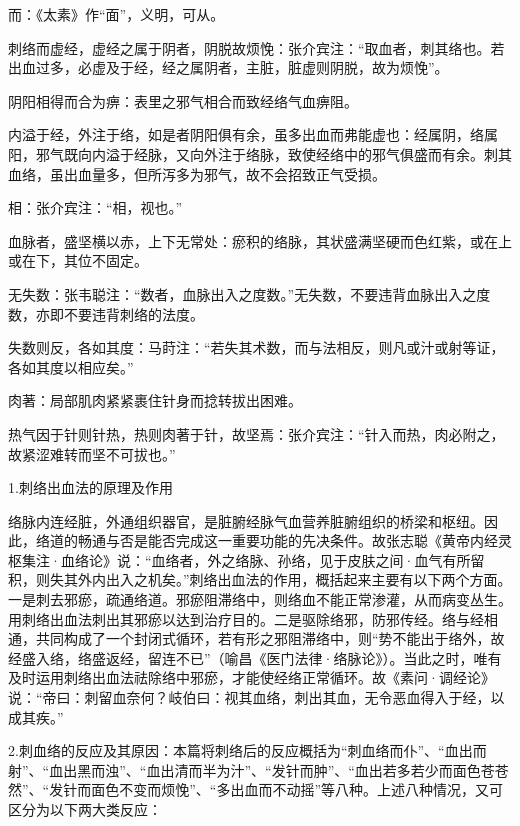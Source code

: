 \documentclass[12pt]{ctexbook}%
\begin{document}
\begin{jiaozhu}
  \item 而：《太素》作“面”，义明，可从。
  \item 刺络而虚经，虚经之属于阴者，阴脱故烦悗：张介宾注：“取血者，刺其络也。若出血过多，必虚及于经，经之属阴者，主脏，脏虚则阴脱，故为烦悗”。
  \item 阴阳相得而合为痹：表里之邪气相合而致经络气血痹阻。
  \item 内溢于经，外注于络，如是者阴阳俱有余，虽多出血而弗能虚也：经属阴，络属阳，邪气既向内溢于经脉，又向外注于络脉，致使经络中的邪气俱盛而有余。刺其血络，虽出血量多，但所泻多为邪气，故不会招致正气受损。
  \item 相：张介宾注：“相，视也。”
  \item 血脉者，盛坚横以赤，上下无常处：瘀积的络脉，其状盛满坚硬而色红紫，或在上或在下，其位不固定。
  \item 无失数：张韦聪注：“数者，血脉出入之度数。”无失数，不要违背血脉出入之度数，亦即不要违背刺络的法度。
  \item 失数则反，各如其度：马莳注：“若失其术数，而与法相反，则凡或汁或射等证，各如其度以相应矣。”
  \item 肉著：局部肌肉紧紧裹住针身而捻转拔出困难。
  \item 热气因于针则针热，热则肉著于针，故坚焉：张介宾注：“针入而热，肉必附之，故紧涩难转而坚不可拔也。”
\end{jiaozhu}


1.刺络出血法的原理及作用

络脉内连经脏，外通组织器官，是脏腑经脉气血营养脏腑组织的桥梁和枢纽。因此，络道的畅通与否是能否完成这一重要功能的先决条件。故张志聪《黄帝内经灵枢集注·血络论》说：“血络者，外之络脉、孙络，见于皮肤之间·血气有所留积，则失其外内出入之机矣。”刺络出血法的作用，概括起来主要有以下两个方面。一是刺去邪瘀，疏通络道。邪瘀阻滞络中，则络血不能正常渗灌，从而病变丛生。用刺络出血法刺出其邪瘀以达到治疗目的。二是驱除络邪，防邪传经。络与经相通，共同构成了一个封闭式循环，若有形之邪阻滞络中，则“势不能出于络外，故经盛入络，络盛返经，留连不已”（喻昌《医门法律·络脉论》）。当此之时，唯有及时运用刺络出血法祛除络中邪瘀，才能使经络正常循环。故《素问·调经论》说：“帝曰：刺留血奈何？岐伯曰：视其血络，刺出其血，无令恶血得入于经，以成其疾。”

2.刺血络的反应及其原因：本篇将刺络后的反应概括为“刺血络而仆”、“血出而射”、“血出黑而浊”、“血出清而半为汁”、“发针而肿”、“血出若多若少而面色苍苍然”、“发针而面色不变而烦悗”、“多出血而不动摇”等八种。上述八种情况，又可区分为以下两大类反应：
\end{document}
